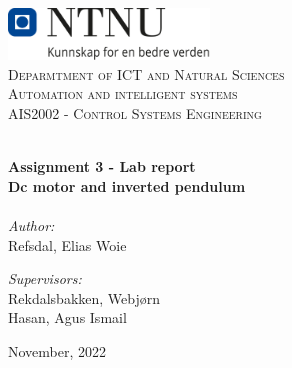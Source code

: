 
\begin{titlepage}
\vbox{ }
\vbox{ }
\begin{center}
\includegraphics[width=0.40\textwidth]{Images/NTNU_logo.png} \\[1cm]
\textsc{\LARGE Deparmtment of ICT and Natural Sciences}\\[1.5cm]
\textsc{\LARGE Automation and intelligent systems}\\ [1.5cm]
\textsc{\Large AIS2002 - Control Systems Engineering}\\[0.5cm]
\vbox{ }

\HRule \\[0.4cm]

{ \huge \bfseries Assignment 3 - Lab report}\\[0.4cm]
{ \large \bfseries Dc motor and inverted pendulum}\\[0.4cm]
\HRule \\[1.5cm]

\large
\emph{Author:}\\[0.2cm]
Refsdal, Elias Woie\\[0.1cm]
\vfill

\large
\emph{Supervisors:}\\ [0.2cm]
Rekdalsbakken, Webjørn\\[0.1cm]
Hasan, Agus Ismail \\[0.1cm]
\vfill




{\large November, 2022}
\end{center}
\end{titlepage}